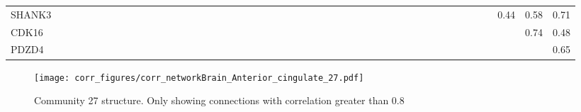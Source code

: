 \begin{longtable}{lrrrrrrrrrrrrrrrrrrrrrrrrrrrrrrrrrrrrrrrrrrrrrrr}
SHANK3   &               &              &              &            &              &             &               &             &             &             &            &            &            &           &             &             &              &              &             &              &             &              &            &              &              &            &               &              &            &            &               &             &                &           &               &             &                &             &           &            &                &             &            &              &        0.44 &        0.58 &        0.71 \\
CDK16    &               &              &              &            &              &             &               &             &             &             &            &            &            &           &             &             &              &              &             &              &             &              &            &              &              &            &               &              &            &            &               &             &                &           &               &             &                &             &           &            &                &             &            &              &             &        0.74 &        0.48 \\
PDZD4    &               &              &              &            &              &             &               &             &             &             &            &            &            &           &             &             &              &              &             &              &             &              &            &              &              &            &               &              &            &            &               &             &                &           &               &             &                &             &           &            &                &             &            &              &             &             &        0.65 \\
\end{longtable}


\begin{figure}[h!]
\centering
\texttt{[image: corr\_figures/corr\_networkBrain\_Anterior\_cingulate\_27.pdf]}
\caption{Community 27 structure. Only showing connections with correlation greater than 0.8}
\end{figure}



